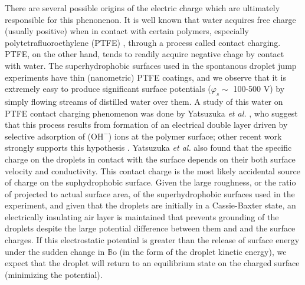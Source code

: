\documentclass[12pt,a4paper,oneside]{book}
\begin{document}
There are several possible origins of the electric charge which are ultimately responsible for this phenonenon. It is well known that water acquires free charge (usually positive) when in contact with certain polymers, especially polytetrafluoroethylene (PTFE) \cite{langmuir_surface_1938}, through a process called contact charging. PTFE, on the other hand, tends to readily acquire negative chage by contact with water. The superhydrophobic surfaces used in the spontanous droplet jump experiments have thin (nanometric) PTFE coatings, and we observe that it is extremely easy to produce significant surface potentials ($\varphi_s \sim$ 100-500 V) by simply flowing streams of distilled water over them. A study of this water on PTFE contact charging phenomenon was done by Yatsuzuka \emph{et al.} \cite{yatsuzuka_electrification_1994}, who suggest that this process results from formation of an electrical double layer driven by selective adsorption of ($\mbox{OH}^-$) ions at the polymer surface; other recent work strongly supports this hypothesis \cite{beattie_intrinsic_2006} \cite{strazdaite_water_2015}. Yatsuzuka \emph{et al.} also found that the specific charge on the droplets in contact with the surface depends on their both surface velocity and conductivity. This contact charge is the most likely accidental source of charge on the suphydrophobic surface. Given the large roughness, or the ratio of projected to actual surface area, of the superhydrophobic surfaces used in the experiment, and given that the droplets are initially in a Cassie-Baxter state, an electrically insulating air layer is maintained that prevents grounding of the droplets despite the large potential difference between them and and the surface charges. If this electrostatic potential is greater than the release of surface energy under the sudden change in $\mathbb{B}\mbox{o}$ (in the form of the droplet kinetic energy), we expect that the droplet will return to an equilibrium state on the charged surface (minimizing the potential).
\end{document}
